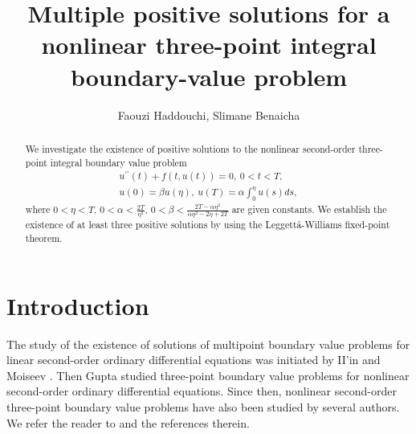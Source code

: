 \documentclass[reqno]{amsart}\usepackage{amsmath}
\begin{document}
\title[ Multiple positive solutions ]{ Multiple positive solutions for a nonlinear
three-point integral boundary-value problem}
\author[F. Haddouchi, S. Benaicha]{Faouzi Haddouchi, Slimane Benaicha}
\address{Faouzi Haddouchi\\
Department of Physics, University of Sciences and Technology of
Oran, El Mnaouar, BP 1505, 31000 Oran, Algeria}
\address{Slimane Benaicha \\
Department of Mathematics, University of Oran, Es-senia, 31000 Oran,
Algeria} 



\begin{abstract}

We investigate the existence of positive solutions to the nonlinear
second-order three-point integral boundary value problem
\begin{equation*} \label{eq-1}
\begin{gathered}
{u^{\prime \prime }}(t)+f(t, u(t))=0,\ 0<t<T, \\
u(0)={\beta}u(\eta),\ u(T)={\alpha}\int_{0}^{\eta}u(s)ds,
\end{gathered}
\end{equation*}
where $0<{\eta}<T$, $0<{\alpha}< \frac{2T}{{\eta}^{2}}$,
$0<{\beta}<\frac{2T-\alpha\eta^{2}}{\alpha\eta^{2}-2\eta+2T}$ are
given constants. We establish the existence of at least three positive solutions by using the
Leggettâ-Williams fixed-point theorem.
\end{abstract}

\maketitle
{}
\newtheorem{theorem}{Theorem}[section]
\newtheorem{lemma}[theorem]{Lemma}
\newtheorem{definition}[theorem]{Definition}
\newtheorem{example}[theorem]{Example}
\newtheorem{remark}[theorem]{Remark}
\allowdisplaybreaks

\section{Introduction}
The study of the existence of solutions of multipoint boundary value
problems for linear second-order ordinary differential equations was
initiated by II'in and Moiseev \cite{Mois}. Then Gupta \cite{Gupt}
studied three-point boundary value problems for nonlinear
second-order ordinary differential equations. Since then, nonlinear
second-order three-point boundary value problems have also been
studied by several authors. We refer the reader to \cite{Chen, Guo, Good1, Good2, Good3, Good4, Good5,
Han, Liang1, Liang2, Li, Liu1, Liu2, Liu3, Ma1, Ma2, Ma3, Pang,
Sun1, Sun2, Tarib, Webb1, Webb2, Webb3, Webb4, Xu, Yang1, Yang2, Zhang} and the references therein.
\end{document}
